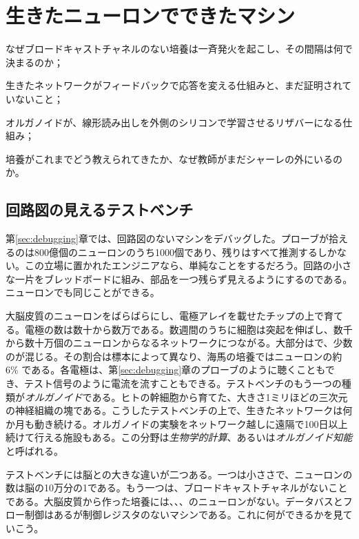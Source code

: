 \chapter{生きたニューロンでできたマシン}
\label{sec:livingmachine}
\begin{chaptergoals}
\item なぜブロードキャストチャネルのない培養は一斉発火を起こし、その間隔は何で決まるのか；
\item 生きたネットワークがフィードバックで応答を変える仕組みと、まだ証明されていないこと；
\item オルガノイドが、線形読み出しを外側のシリコンで学習させるリザバーになる仕組み；
\item 培養がこれまでどう教えられてきたか、なぜ教師がまだシャーレの外にいるのか。
\end{chaptergoals}

\section{回路図の見えるテストベンチ}

第\ref{sec:debugging}章では、回路図のないマシンをデバッグした。プローブが拾えるのは800億個のニューロンのうち1000個であり、残りはすべて推測するしかない。この立場に置かれたエンジニアなら、単純なことをするだろう。回路の小さな一片をブレッドボードに組み、部品を一つ残らず見えるようにするのである。ニューロンでも同じことができる。

大脳皮質のニューロンをばらばらにし、電極アレイを載せたチップの上で育てる。電極の数は数十から数万である。数週間のうちに細胞は突起を伸ばし、数千から数十万個のニューロンからなるネットワークにつながる。大部分はで、少数のが混じる。その割合は標本によって異なり、海馬の培養ではニューロンの約 $6\%$ である\cite{Benson1994}。各電極は、第\ref{sec:debugging}章のプローブのように聴くこともでき、テスト信号のように電流を流すこともできる。テストベンチのもう一つの種類が\emph{オルガノイド}である。ヒトの幹細胞から育てた、大きさ1ミリほどの三次元の神経組織の塊である\cite{Lancaster2013}。こうしたテストベンチの上で、生きたネットワークは何か月も動き続ける。オルガノイドの実験をネットワーク越しに遠隔で100日以上続けて行える施設もある\cite{Jordan2024}。この分野は\emph{生物学的計算}、あるいは\emph{オルガノイド知能}と呼ばれる\cite{Smirnova2023}。

テストベンチには脳との大きな違いが二つある。一つは小ささで、ニューロンの数は脳の10万分の1である。もう一つは、ブロードキャストチャネルがないことである。大脳皮質から作った培養には、、、のニューロンがない。データバスとフロー制御はあるが制御レジスタのないマシンである。これに何ができるかを見ていこう。

